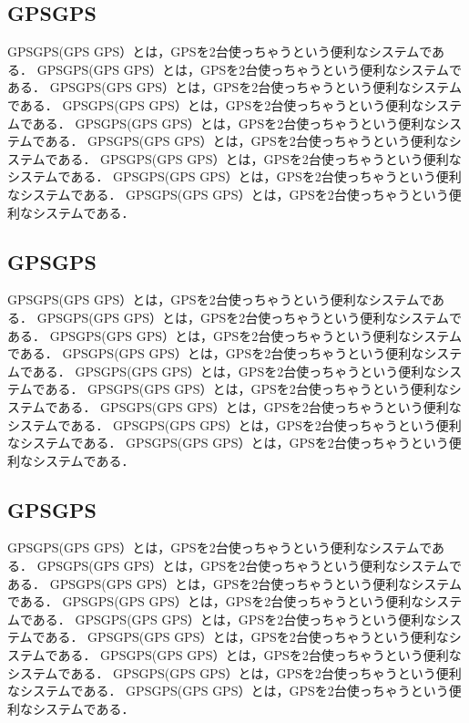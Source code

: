 \subsection{GPSGPS}
GPSGPS(GPS GPS）とは，GPSを2台使っちゃうという便利なシステムである．
GPSGPS(GPS GPS）とは，GPSを2台使っちゃうという便利なシステムである．
GPSGPS(GPS GPS）とは，GPSを2台使っちゃうという便利なシステムである．
GPSGPS(GPS GPS）とは，GPSを2台使っちゃうという便利なシステムである．
GPSGPS(GPS GPS）とは，GPSを2台使っちゃうという便利なシステムである．
GPSGPS(GPS GPS）とは，GPSを2台使っちゃうという便利なシステムである．
GPSGPS(GPS GPS）とは，GPSを2台使っちゃうという便利なシステムである．
GPSGPS(GPS GPS）とは，GPSを2台使っちゃうという便利なシステムである．
GPSGPS(GPS GPS）とは，GPSを2台使っちゃうという便利なシステムである．

\subsection{GPSGPS}
GPSGPS(GPS GPS）とは，GPSを2台使っちゃうという便利なシステムである．
GPSGPS(GPS GPS）とは，GPSを2台使っちゃうという便利なシステムである．
GPSGPS(GPS GPS）とは，GPSを2台使っちゃうという便利なシステムである．
GPSGPS(GPS GPS）とは，GPSを2台使っちゃうという便利なシステムである．
GPSGPS(GPS GPS）とは，GPSを2台使っちゃうという便利なシステムである．
GPSGPS(GPS GPS）とは，GPSを2台使っちゃうという便利なシステムである．
GPSGPS(GPS GPS）とは，GPSを2台使っちゃうという便利なシステムである．
GPSGPS(GPS GPS）とは，GPSを2台使っちゃうという便利なシステムである．
GPSGPS(GPS GPS）とは，GPSを2台使っちゃうという便利なシステムである．

\subsection{GPSGPS}
GPSGPS(GPS GPS）とは，GPSを2台使っちゃうという便利なシステムである．
GPSGPS(GPS GPS）とは，GPSを2台使っちゃうという便利なシステムである．
GPSGPS(GPS GPS）とは，GPSを2台使っちゃうという便利なシステムである．
GPSGPS(GPS GPS）とは，GPSを2台使っちゃうという便利なシステムである．
GPSGPS(GPS GPS）とは，GPSを2台使っちゃうという便利なシステムである．
GPSGPS(GPS GPS）とは，GPSを2台使っちゃうという便利なシステムである．
GPSGPS(GPS GPS）とは，GPSを2台使っちゃうという便利なシステムである．
GPSGPS(GPS GPS）とは，GPSを2台使っちゃうという便利なシステムである．
GPSGPS(GPS GPS）とは，GPSを2台使っちゃうという便利なシステムである．

